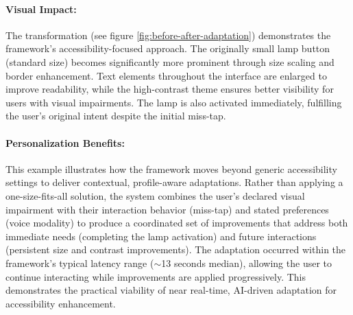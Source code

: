 \paragraph{Visual Impact:} 
The transformation (see figure \ref{fig:before-after-adaptation}) demonstrates the framework's accessibility-focused approach. The originally small lamp button (standard size) becomes significantly more prominent through size scaling and border enhancement. Text elements throughout the interface are enlarged to improve readability, while the high-contrast theme ensures better visibility for users with visual impairments. The lamp is also activated immediately, fulfilling the user's original intent despite the initial miss-tap.

\paragraph{Personalization Benefits:} 
This example illustrates how the framework moves beyond generic accessibility settings to deliver contextual, profile-aware adaptations. Rather than applying a one-size-fits-all solution, the system combines the user's declared visual impairment with their interaction behavior (miss-tap) and stated preferences (voice modality) to produce a coordinated set of improvements that address both immediate needs (completing the lamp activation) and future interactions (persistent size and contrast improvements).
The adaptation occurred within the framework's typical latency range ($\sim$13 seconds median), allowing the user to continue interacting while improvements are applied progressively. This demonstrates the practical viability of near real-time, AI-driven adaptation for accessibility enhancement.

